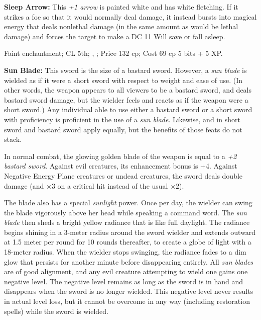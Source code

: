 

\textbf{Sleep Arrow:} This \emph{+1 arrow} is painted white and has white fletching. If it strikes a foe so that it would normally deal damage, it instead bursts into magical energy that deals nonlethal damage (in the same amount as would be lethal damage) and forces the target to make a DC 11 Will save or fall asleep.

Faint enchantment; CL 5th; , ; Price 132 cp; Cost 69 cp 5 bits + 5 XP.


\textbf{Sun Blade:} This sword is the size of a bastard sword. However, a \emph{sun blade} is wielded as if it were a short sword with respect to weight and ease of use. (In other words, the weapon appears to all viewers to be a bastard sword, and deals bastard sword damage, but the wielder feels and reacts as if the weapon were a short sword.) Any individual able to use either a bastard sword or a short sword with proficiency is proficient in the use of a \emph{sun blade}. Likewise,  and  in short sword and bastard sword apply equally, but the benefits of those feats do not stack.

In normal combat, the glowing golden blade of the weapon is equal to a \emph{+2 bastard sword}. Against evil creatures, its enhancement bonus is +4. Against Negative Energy Plane creatures or undead creatures, the sword deals double damage (and $\times3$ on a critical hit instead of the usual $\times2$).

The blade also has a special \emph{sunlight} power. Once per day, the wielder can swing the blade vigorously above her head while speaking a command word. The \emph{sun blade} then sheds a bright yellow radiance that is like full daylight. The radiance begins shining in a 3-meter radius around the sword wielder and extends outward at 1.5 meter per round for 10 rounds thereafter, to create a globe of light with a 18-meter radius. When the wielder stops swinging, the radiance fades to a dim glow that persists for another minute before disappearing entirely. All \emph{sun blades} are of good alignment, and any evil creature attempting to wield one gains one negative level. The negative level remains as long as the sword is in hand and disappears when the sword is no longer wielded. This negative level never results in actual level loss, but it cannot be overcome in any way (including restoration spells) while the sword is wielded.


